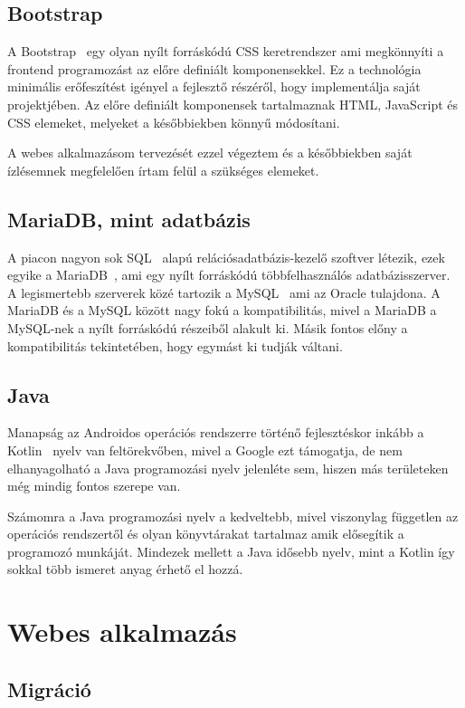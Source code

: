 \documentclass[
]{thesis-ekf}
\theoremstyle{definition}
\theoremstyle{remark}
\begin{document}
	\section{Bootstrap}
	A Bootstrap~\cite{bootstrap_doc} egy olyan nyílt forráskódú CSS keretrendszer ami megkönnyíti a frontend programozást az előre definiált komponensekkel. Ez a technológia minimális erőfeszítést igényel a fejlesztő részéről, hogy implementálja saját projektjében. Az előre definiált komponensek tartalmaznak HTML, JavaScript és CSS elemeket, melyeket a későbbiekben könnyű módosítani.
	
	A webes alkalmazásom tervezését ezzel végeztem és a későbbiekben saját ízlésemnek megfelelően írtam felül a szükséges elemeket. 
	
	\section{MariaDB, mint adatbázis}
	A piacon nagyon sok SQL~\cite{sql_book} alapú relációsadatbázis-kezelő szoftver létezik, ezek egyike a MariaDB~\cite{mariadb_doc}, ami egy nyílt forráskódú többfelhasználós adatbázisszerver. A legismertebb szerverek közé tartozik a MySQL~\cite{mysql_book} ami az Oracle tulajdona. A MariaDB és a MySQL között nagy fokú a kompatibilitás, mivel a MariaDB a MySQL-nek a nyílt forráskódú részeiből alakult ki. Másik fontos előny a kompatibilitás tekintetében, hogy egymást ki tudják váltani.
	
	\section{Java}
	Manapság az Androidos operációs rendszerre történő fejlesztéskor inkább a Kotlin~\cite{kotlin_book} nyelv van feltörekvőben, mivel a Google ezt támogatja, de nem elhanyagolható a Java programozási nyelv jelenléte sem, hiszen más területeken még mindig fontos szerepe van. 
	
	Számomra a Java programozási nyelv a kedveltebb, mivel viszonylag független az operációs rendszertől és olyan könyvtárakat tartalmaz amik elősegítik a programozó munkáját. Mindezek mellett a Java idősebb nyelv, mint a Kotlin így sokkal több ismeret anyag érhető el hozzá.
	
	\chapter{Webes alkalmazás}
	\section{Migráció}
\end{document}
